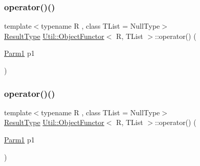 \subsubsection{\texorpdfstring{operator()()}{operator()()}\hspace{0.1cm}{\footnotesize\ttfamily [4/18]}}
{\footnotesize\ttfamily template$<$typename R , class T\+List  = Null\+Type$>$ \\
\mbox{\hyperlink{classUtil_1_1ObjectFunctor_a77f816e98108848347d0dfc085090a1c}{Result\+Type}} \mbox{\hyperlink{classUtil_1_1ObjectFunctor}{Util\+::\+Object\+Functor}}$<$ R, T\+List $>$\+::operator() (\begin{DoxyParamCaption}\item[{\mbox{\hyperlink{classUtil_1_1ObjectFunctor_a199715d28029627c2ae7219c13b04d26}{Parm1}}}]{p1 }\end{DoxyParamCaption})\hspace{0.3cm}{\ttfamily [inline]}}

\mbox{\label{classUtil_1_1ObjectFunctor_affe11b4a42e49e60ac921c2353e3ce18}} 
\subsubsection{\texorpdfstring{operator()()}{operator()()}\hspace{0.1cm}{\footnotesize\ttfamily [5/18]}}
{\footnotesize\ttfamily template$<$typename R , class T\+List  = Null\+Type$>$ \\
\mbox{\hyperlink{classUtil_1_1ObjectFunctor_a77f816e98108848347d0dfc085090a1c}{Result\+Type}} \mbox{\hyperlink{classUtil_1_1ObjectFunctor}{Util\+::\+Object\+Functor}}$<$ R, T\+List $>$\+::operator() (\begin{DoxyParamCaption}\item[{\mbox{\hyperlink{classUtil_1_1ObjectFunctor_a199715d28029627c2ae7219c13b04d26}{Parm1}}}]{p1 }\end{DoxyParamCaption})\hspace{0.3cm}{\ttfamily [inline]}}

\mbox{\label{classUtil_1_1ObjectFunctor_affe11b4a42e49e60ac921c2353e3ce18}} 
